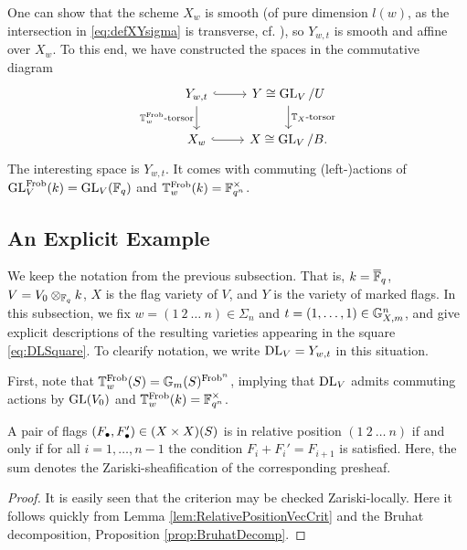 \documentclass[../main.tex]{subfiles}
\begin{document}
One can show that the scheme $X_w$ is smooth (of pure dimension $l(w)$, 
as the intersection in \eqref{eq:defXYsigma} is transverse, cf.
\cite{delignelusztig1976}), so $Y_{w, t}$ is smooth and affine over $X_w$. 
To this end, we have constructed the spaces in the commutative diagram
\begin{equation} \label{eq:DLSquare}
\begin{tikzcd}[ampersand replacement=\&]
	{Y_{w,t}} \& {Y \cong \GL_V/U} \\
	{X_w} \& {X \cong \GL_V/B.}
	\arrow[hook, from=1-1, to=1-2]
	\arrow["{\TT_w^{\Frob}\text{-torsor}}"', from=1-1, to=2-1]
	\arrow["{\TT_X\text{-torsor}}", from=1-2, to=2-2]
	\arrow[hook, from=2-1, to=2-2]
\end{tikzcd}
\end{equation}
The interesting space is $Y_{w,t}$. It comes with commuting (left-)actions of 
$\operatorname{GL}_V^{\mathrm{Frob}}(k) = \operatorname{GL}_V(\mathbb{F}_q)$ and $\mathbb{T}_w^{\mathrm{Frob}}(k) = \mathbb{F}_{q^n}^\times$. 

\subsection{An Explicit Example} %
\label{sub:An Explicit Example}
We keep the notation from the previous subsection. That is, $k = \overline {\mathbb{F}}_q$, 
$V = V_0 \otimes_{\mathbb{F}_q} k$, $X$ is the flag variety of $V$, and $Y$ is the 
variety of marked flags. In this subsection, we fix
$w = (1 \ 2 \ \dots \ n) \in \Sigma_n$ and $t = (1, \dots, 1) \in \mathbb{G}_{X,m}^n$,
and give explicit descriptions of the resulting varieties appearing in the
square \eqref{eq:DLSquare}. To clearify notation, we write $\mathrm{DL}_V = Y_{w, t}$ in this
situation.

First, note that $\mathbb{T}_w^{\mathrm{Frob}}(S) = \mathbb{G}_m(S)^{\mathrm{Frob}^n}$, implying that
$\mathrm{DL}_V$ admits commuting actions 
by $\operatorname{GL}(V_0)$ and $\mathbb{T}_w^{\mathrm{Frob}}(k) = \mathbb{F}_{q^n}^\times$.

\begin{lem}\label{lem:FlagsInRelPosWareez}
  A pair of flags $(F_\bullet, F_\bullet') \in (X \times X)(S)$ is in relative position
  $(1 \ 2 \ \dots \ n)$ 
  if and only if for all $i = 1, \dots, n-1$ the condition $F_i + F_i' =
  F_{i+1}$ is satisfied. Here, the sum denotes the Zariski-sheafification of the
  corresponding presheaf. 
\begin{proof}
  It is easily seen that the criterion may be checked Zariski-locally.
  Here it follows quickly from Lemma \ref{lem:RelativePositionVecCrit} and 
  the Bruhat decomposition, Proposition \ref{prop:BruhatDecomp}.
  \end{proof}
\end{lem}
\end{document}
